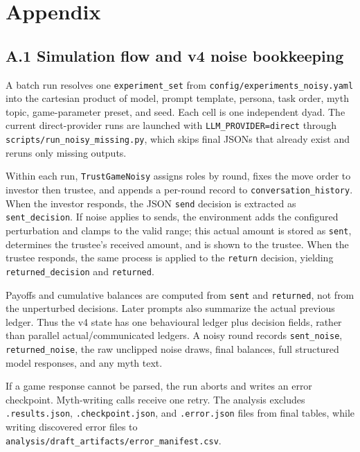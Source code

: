 \documentclass[
  10pt,
  letterpaper,
]{article}
\begin{document}
\section{Appendix}\label{appendix}

\subsection{A.1 Simulation flow and v4 noise
bookkeeping}\label{a.1-simulation-flow-and-v4-noise-bookkeeping}

A batch run resolves one \texttt{experiment\_set} from
\texttt{config/experiments\_noisy.yaml} into the cartesian product of
model, prompt template, persona, task order, myth topic, game-parameter
preset, and seed. Each cell is one independent dyad. The current
direct-provider runs are launched with \texttt{LLM\_PROVIDER=direct}
through \texttt{scripts/run\_noisy\_missing.py}, which skips final JSONs
that already exist and reruns only missing outputs.

Within each run, \texttt{TrustGameNoisy} assigns roles by round, fixes
the move order to investor then trustee, and appends a per-round record
to \texttt{conversation\_history}. When the investor responds, the JSON
\texttt{send} decision is extracted as \texttt{sent\_decision}. If noise
applies to sends, the environment adds the configured perturbation and
clamps to the valid range; this actual amount is stored as
\texttt{sent}, determines the trustee's received amount, and is shown to
the trustee. When the trustee responds, the same process is applied to
the \texttt{return} decision, yielding \texttt{returned\_decision} and
\texttt{returned}.

Payoffs and cumulative balances are computed from \texttt{sent} and
\texttt{returned}, not from the unperturbed decisions. Later prompts
also summarize the actual previous ledger. Thus the v4 state has one
behavioural ledger plus decision fields, rather than parallel
actual/communicated ledgers. A noisy round records \texttt{sent\_noise},
\texttt{returned\_noise}, the raw unclipped noise draws, final balances,
full structured model responses, and any myth text.

If a game response cannot be parsed, the run aborts and writes an error
checkpoint. Myth-writing calls receive one retry. The analysis excludes
\texttt{.results.json}, \texttt{.checkpoint.json}, and
\texttt{.error.json} files from final tables, while writing discovered
error files to \texttt{analysis/draft\_artifacts/error\_manifest.csv}.
\end{document}
